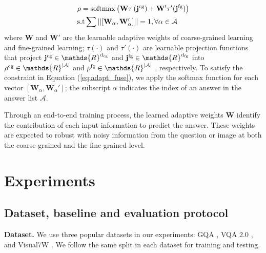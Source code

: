 \documentclass[10pt,twocolumn,letterpaper]{article}
\newcommand{\softmax}{\mathrm{softmax}}
\begin{document}
\begin{equation}
\begin{aligned}
&\rho = \softmax \left(\mathbf{W}\tau\left({ \mathbf{j}^{\rm cg}}\right)+{\mathbf{W}'}{\tau'}({\mathbf{ j}^{\rm fg}})\right)\\
&\text{s.t} \sum  \left|\left|\left[{\mathbf{W}_\alpha, \mathbf{W}_\alpha'} \right]\right|\right| = 1, \forall \mathrm{\alpha} \in \mathcal{A}
\end{aligned}
\label{eq:adapt_fuse}
\end{equation}
where $\mathbf{W}$ and $\mathbf{W}'$ are the learnable adaptive weights of coarse-grained learning and fine-grained learning; $\tau(\cdotp)$ and $\tau'(\cdotp)$ are learnable projection functions that project $\mathbf{j}^{\rm cg} \in \mathds{R}^{\rm d_{cg}}$
and 
$\mathbf{j}^{\rm fg} \in \mathds{R}^{\rm d_{fg}}$
into  
$\rho^{\rm cg} \in \mathds{R}^{|\mathcal{A}|}$ 
and 
$\rho^{\rm fg} \in \mathds{R}^{|\mathcal{A}|}$ , respectively. 
To satisfy the constraint in Equation (\ref{eq:adapt_fuse}), we apply the softmax function for each vector $\left[\mathbf{W}_\alpha, \mathbf{W}_\alpha'\right]$; the subscript $\alpha$ indicates the index of an answer in the answer list $\mathcal{A}$.

Through an end-to-end training process, the learned adaptive weights $\mathbf{W}$ identify the contribution of each input information to predict the answer. These weights are expected to robust with noisy information from the question or image at both the coarse-grained and the fine-grained level.  






















\section{Experiments}
\label{sec:exp}
\subsection{Dataset, baseline and evaluation protocol}
\textbf{Dataset.} We use three popular datasets in our experiments: GQA  \cite{hudson2019gqa}, VQA 2.0 \cite{vqav22016}, and Visual7W  \cite{zhu2016visual7w} . We follow the same split in each dataset for training and testing.
\end{document}
